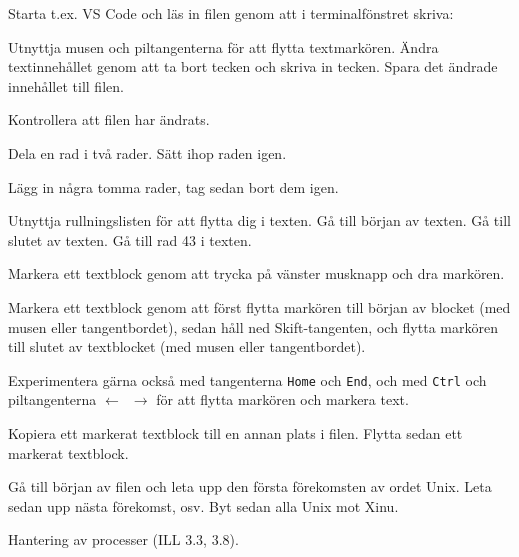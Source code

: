 \begin{Datorarbete}
\begin{Deluppgifter}
\item Starta t.ex. VS Code och läs in filen  genom att i terminalfönstret skriva:\\
\item Utnyttja musen och piltangenterna för att flytta textmarkören. Ändra textinnehållet genom att ta bort tecken och skriva in tecken. Spara det ändrade innehållet till filen.
\item Kontrollera att filen  har ändrats.
\item Dela en rad i två rader. Sätt ihop raden igen.
\item Lägg in några tomma rader, tag sedan bort dem igen.
\item Utnyttja rullningslisten för att flytta dig i texten. Gå till början av texten. Gå till slutet av texten. Gå till rad 43 i texten.
\item Markera ett textblock genom att trycka på vänster musknapp och dra markören.
\item Markera ett textblock genom att först flytta markören till början av blocket (med musen eller tangentbordet), sedan håll ned Skift-tangenten, och flytta markören till slutet av textblocket (med musen eller tangentbordet).
\item Experimentera gärna också med tangenterna \texttt{Home} och \texttt{End}, och med \texttt{Ctrl} och piltangenterna \texttt{$\leftarrow$ $\rightarrow$} för att flytta markören och markera text.
\item Kopiera ett markerat textblock till en annan plats i filen. Flytta sedan ett markerat textblock.
\item Gå till början av filen och leta upp den första förekomsten av ordet Unix. Leta sedan upp nästa förekomst, osv. Byt sedan alla Unix mot Xinu.
\end{Deluppgifter}

\item Hantering av processer (ILL 3.3, 3.8).


\end{Datorarbete}
